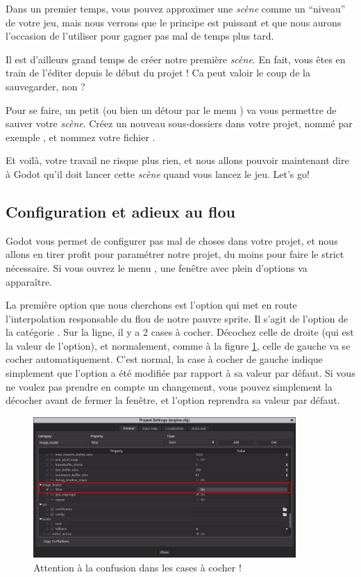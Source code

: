 Dans un premier temps, vous pouvez approximer une \emph{scène} comme un ``niveau'' de votre jeu, mais nous verrons que le principe est puissant et que nous aurons l'occasion de l'utiliser pour gagner pas mal de temps plus tard.

Il est d'ailleurs grand temps de créer notre première \emph{scène}. En fait, vous êtes en train de l'éditer depuis le début du projet ! Ca peut valoir le coup de la sauvegarder, non ?

Pour se faire, un petit  (ou bien un détour par le menu ) va vous permettre de sauver votre \emph{scène}. Créez un nouveau sous-dossiers dans votre projet, nommé par exemple , et nommez votre fichier .

Et voilà, votre travail ne risque plus rien, et nous allons pouvoir maintenant dire à Godot qu'il doit lancer cette \emph{scène} quand vous lancez le jeu. Let's go!

\subsection{Configuration et adieux au flou}

Godot vous permet de configurer pas mal de choses dans votre projet, et nous allons en tirer profit pour paramétrer notre projet, du moins pour faire le strict nécessaire. Si vous ouvrez le menu , une fenêtre avec plein d'options va apparaître.

La première option que nous cherchons est l'option qui met en route l'interpolation responsable du flou de notre pauvre sprite. Il s'agit de l'option  de la catégorie . Sur la ligne, il y a 2 cases à cocher. Décochez celle de droite (qui est la valeur de l'option), et normalement, comme à la figure \ref{lvl1-filtersetting}, celle de gauche va se cocher automatiquement. C'est normal, la case à cocher de gauche indique simplement que l'option a été modifiée par rapport à sa valeur par défaut. Si vous ne voulez pas prendre en compte un changement, vous pouvez simplement la décocher avant de fermer la fenêtre, et l'option reprendra sa valeur par défaut.

\begin{figure}
  \begin{center}
    \includegraphics[width=10cm]{img/lvl1-filtersetting.png}
  \end{center}
  \caption{\label{lvl1-filtersetting} Attention à la confusion dans les cases à cocher !}
\end{figure}


